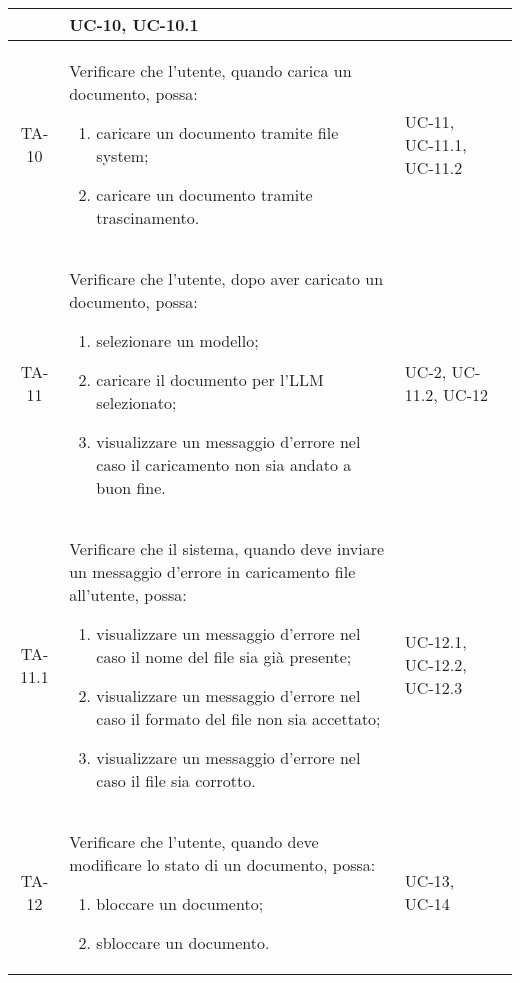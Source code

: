 \begin{xltabular}{\textwidth}{| c | X | X | c |}
\begin{enumerate}
    \end{enumerate}& UC-10, UC-10.1 &  \\
    \hline
    TA-10 & Verificare che l’utente, quando carica un documento, possa:
    \begin{enumerate}
        \item caricare un documento tramite file system;
        \item caricare un documento tramite trascinamento.
        
    \end{enumerate}& UC-11, UC-11.1, UC-11.2 &  \\
    \hline
    TA-11 & Verificare che l’utente, dopo aver caricato un documento, possa:
    \begin{enumerate}
        \item selezionare un modello;
        \item caricare il documento per l'LLM selezionato;
        \item visualizzare un messaggio d'errore nel caso il caricamento non sia andato a buon fine.
        
    \end{enumerate}& UC-2, UC-11.2, UC-12 &  \\
    \hline
     TA-11.1 & Verificare che il sistema, quando deve inviare un messaggio d'errore in caricamento file all'utente, possa:
    \begin{enumerate}
        \item visualizzare un messaggio d'errore nel caso il nome del file sia già presente;
        \item visualizzare un messaggio d'errore nel caso il formato del file non sia accettato;
        \item visualizzare un messaggio d'errore nel caso il file sia corrotto.
        
    \end{enumerate}& UC-12.1, UC-12.2, UC-12.3 &  \\
    \hline

    TA-12 & Verificare che l’utente, quando deve modificare lo stato di un documento, possa:
    \begin{enumerate}
        \item bloccare un documento;
        \item sbloccare un documento.
        
    \end{enumerate}& UC-13, UC-14 &  \\
    \hline
    

\end{xltabular}

